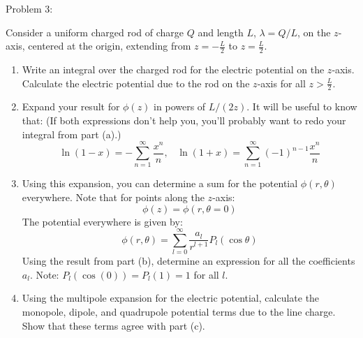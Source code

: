 \begin{Problem}{Problem 3:}
{
Consider a uniform charged rod of charge $Q$ and length $L$, $\lambda = Q/L$, on the $z$-axis, centered at the origin, extending from $z = -\frac{L}{2}$ to $z = \frac{L}{2}$.
\begin{enumerate}[label=(\alph*)]
\item Write an integral over the charged rod for the electric potential on the $z$‐axis. Calculate the electric potential due to the rod on the $z$‐axis for all $z > \frac{L}{2}$.
\item Expand your result for $\phi(z)$ in powers of $L/(2z)$. It will be useful to know that: (If both expressions don't help you, you'll probably want to redo your integral from part (a).)
\begin{equation*}
\ln{(1-x)} = - \sum^{\infty}_{n=1} \frac{x^{n}}{n}, \hspace{10pt} \ln{(1+x)} = \sum^{\infty}_{n=1} (-1)^{n-1} \frac{x^{n}}{n}
\end{equation*}
\item Using this expansion, you can determine a sum for the potential $\phi(r,\theta)$ everywhere. Note that for points along the $z$-axis:
\begin{equation*}
\phi(z) = \phi(r,\theta = 0)
\end{equation*}
The potential everywhere is given by:
\begin{equation*}
\phi(r,\theta) = \sum^{\infty}_{l=0} \frac{a_{l}}{r^{l+1}} P_{l}(\cos{\theta})
\end{equation*}
Using the result from part (b), determine an expression for all the coefficients $a_{l}$.
Note: $P_{l}(\cos(0)) = P_{l}(1) = 1$ for all $l$.
\item Using the multipole expansion for the electric potential, calculate the monopole, dipole, and quadrupole potential terms due to the line charge. Show that these terms agree with part (c).
\end{enumerate}
}
\end{Problem}
